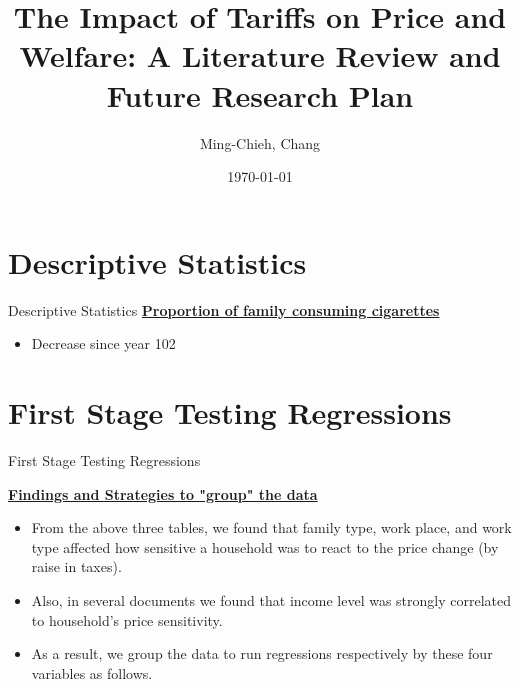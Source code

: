 \documentclass{beamer}
\title[]{The Impact of Tariffs on Price and Welfare: A Literature Review and Future Research Plan}
\author[]{Ming-Chieh, Chang}
\institute{National Taiwan University}
\date{\today}
\begin{document}
\begin{frame}
    \titlepage 
\end{frame}

\section{Descriptive Statistics}

\begin{frame}{Descriptive Statistics}
\underline{\textbf{Proportion of family consuming cigarettes}}
\begin{itemize}
    \item Decrease since year 102
\end{itemize}
\end{frame}


\section{First Stage Testing Regressions}
\begin{frame}{First Stage Testing Regressions}

\underline{\textbf{Findings and Strategies to "group" the data}}
\begin{itemize}
    \item From the above three tables, we found that {\color{red}family type, work place, and work type} 
    affected how sensitive a household was to react to the price change (by raise in taxes).
    \item Also, in several documents we found that {\color{red}income level} was strongly correlated to household's price sensitivity.
    \item As a result, we group the data to run regressions respectively by these four variables as follows.
\end{itemize}

\end{frame}
\end{document}
